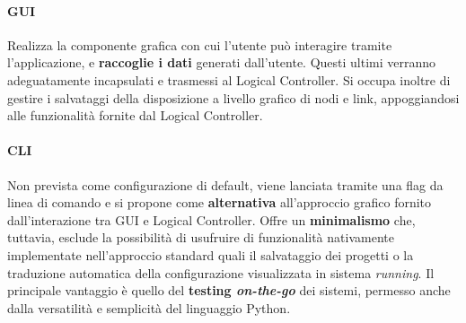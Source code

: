 \paragraph*{GUI} Realizza la componente grafica con cui l'utente può interagire tramite l'applicazione, e \textbf{raccoglie i dati} generati dall'utente. Questi ultimi verranno adeguatamente incapsulati e trasmessi al Logical Controller. Si occupa inoltre di gestire i salvataggi della disposizione a livello grafico di nodi e link, appoggiandosi alle funzionalità fornite dal Logical Controller.
\paragraph*{CLI} 
Non prevista come configurazione di default, viene lanciata tramite una flag da linea di comando e si propone come \textbf{alternativa} all'approccio grafico fornito dall'interazione tra GUI e Logical Controller. Offre un \textbf{minimalismo} che, tuttavia, esclude la possibilità di usufruire di funzionalità nativamente implementate nell'approccio standard quali il salvataggio dei progetti o la traduzione automatica della configurazione visualizzata in sistema \textit{running}. 
Il principale vantaggio è quello del \textbf{testing \textit{on-the-go}} dei sistemi, permesso anche dalla versatilità e semplicità del linguaggio Python.

